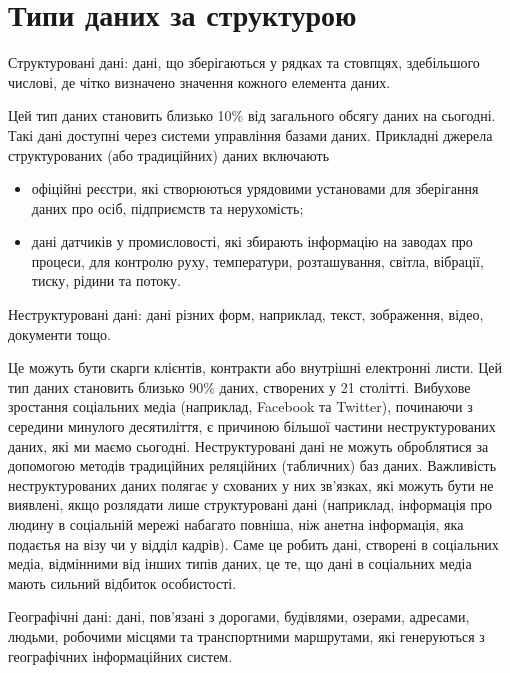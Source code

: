 \section{Типи даних за структурою}

\begin{ozn}
Структуровані дані: дані, що зберігаються у рядках та стовпцях, здебільшого числові, де чітко визначено значення кожного елемента даних. 
\end{ozn}

Цей тип даних становить близько 10\% від загального обсягу даних на сьогодні. Такі дані доступні через системи управління базами даних. Прикладні джерела структурованих (або традиційних) даних включають 

\begin{itemize}
 \item офіційні реєстри, які створюються урядовими установами для зберігання даних про осіб, підприємств та нерухомість;
 \item дані датчиків у промисловості, які збирають інформацію на заводах про процеси, для контролю руху, температури, розташування, світла, вібрації, тиску, рідини та потоку.
\end{itemize}

\begin{ozn}
Неструктуровані дані: дані різних форм, наприклад, текст, зображення, відео, документи тощо. 
\end{ozn}

Це можуть бути скарги клієнтів, контракти або внутрішні електронні листи. Цей тип даних становить близько 90\% даних, створених у 21 столітті. Вибухове зростання соціальних медіа (наприклад, Facebook та Twitter), починаючи з середини минулого десятиліття, є причиною більшої частини неструктурованих даних, які ми маємо сьогодні. Неструктуровані дані не можуть оброблятися за допомогою методів традиційних реляційних (табличних) баз даних. Важливість неструктурованих даних полягає у схованих у них зв'язках, які можуть бути не виявлені, якщо розлядати лише структуровані дані (наприклад, інформація про людину в соціальній мережі набагато повніша, ніж анетна інформація, яка подаєтья на візу чи у відділ кадрів). Саме це робить дані, створені в соціальних медіа, відмінними від інших типів даних, це те, що дані в соціальних медіа мають сильний відбиток особистості.

\begin{ozn}
Географічні дані: дані, пов'язані з дорогами, будівлями, озерами, адресами, людьми, робочими місцями та транспортними маршрутами, які генеруються з географічних інформаційних систем. 
\end{ozn}

